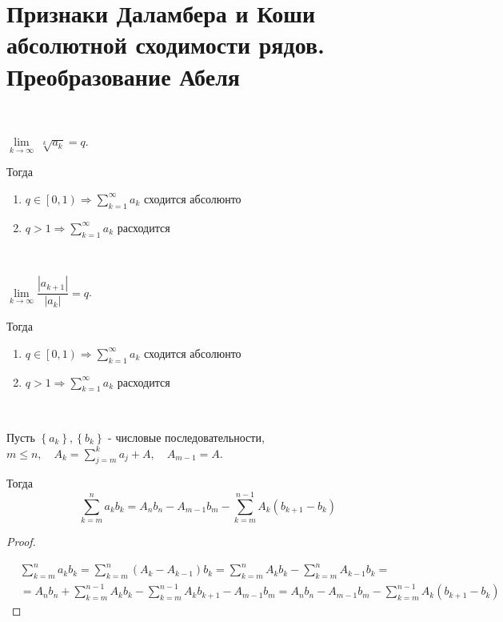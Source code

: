 \documentclass[../main.tex]{subfiles}
\begin{document}
\newpage
\section{Признаки Даламбера и Коши абсолютной сходимости рядов. Преобразование Абеля}

\begin{thm}
    
    ~

    \( \lim\limits_{ k \rightarrow \infty } \;\sqrt[k]{a_k}=q\).

    Тогда
    \begin{enumerate}
        \item \( q \in \left[ 0, 1\right) \Longrightarrow \sum\limits_{ k=1}^{ \infty } a_k\) сходится абсолюнто 
        \item \( q > 1 \Longrightarrow \sum\limits_{ k=1}^{ \infty } a_k\) расходится
    \end{enumerate}
\end{thm}

\begin{thm}
    
    ~

    \( \lim\limits_{ k \rightarrow \infty } \dfrac{ \left| a_{k+1}\right|}{ \left| a_k\right|} =q\).

    Тогда
    \begin{enumerate}
        \item \( q \in \left[ 0, 1\right) \Longrightarrow \sum\limits_{ k=1}^{ \infty } a_k\) сходится абсолюнто 
        \item \( q > 1 \Longrightarrow \sum\limits_{ k=1}^{ \infty } a_k\) расходится
    \end{enumerate}
\end{thm}

\begin{thm}
    
    ~

    Пусть \( \left\{ a_k\right\}, \left\{ b_k\right\}\) - числовые последовательности, \( m \leq n,\quad A_k= \sum\limits_{ j=m}^{ k} a_j+A,\quad A_{m-1}=A\).

    Тогда 
    \[ \sum\limits_{ k=m}^{ n} a_kb_k=A_nb_n-A_{m-1}b_m- \sum\limits_{ k=m}^{ n-1} A_k\left( b_{k+1}-b_k\right)\]
\end{thm}
\begin{proof}
    
    ~

    \begin{equation*}
        \begin{aligned}
            &\sum\limits_{ k=m}^{ n} a_kb_k= \sum\limits_{ k=m}^{ n} \left( A_k-A_{k-1}\right)b_k= \sum\limits_{ k=m}^{ n} A_kb_k- \sum\limits_{ k=m}^{ n} A_{k-1}b_k=\\
            &=A_nb_n+ \sum\limits_{ k=m}^{ n-1} A_kb_k- \sum\limits_{ k=m}^{ n-1} A_kb_{k+1}-A_{m-1}b_m= A_nb_n-A_{m-1}b_m - \sum\limits_{ k=m}^{ n-1} A_k\left( b_{k+1}-b_k\right)
        \end{aligned}
    \end{equation*}
\end{proof}
\end{document}
